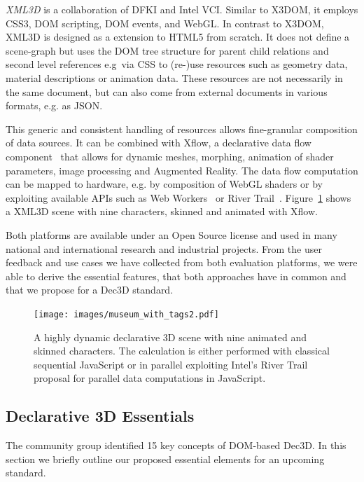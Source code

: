 \documentclass{acmsiggraph}
\begin{document}
\emph{XML3D} \cite{Sons2010} is a collaboration of DFKI and Intel VCI. Similar to X3DOM, it employs CSS3, DOM scripting, DOM events, and WebGL. In contrast to X3DOM, XML3D is designed as a extension to HTML5 from scratch. It does not define a scene-graph but uses the DOM tree structure for parent child relations and second level references e.g\ via CSS to (re-)use resources such as geometry data, material descriptions or animation data. These resources are not necessarily in the same document, but can also come from external documents in various formats, e.g. as JSON.

This generic and consistent handling of resources allows fine-granular composition of data sources. It can be combined with Xflow, a declarative data flow component~\cite{KleinSJRSB12} that allows for dynamic meshes, morphing, animation of shader parameters, image processing and Augmented Reality. The data flow computation can be mapped to hardware, e.g. by composition of WebGL shaders or by exploiting available APIs such as Web Workers~\cite{w3c:webworkers} or River Trail~\cite{Herhut:2012}. Figure~\ref{fig:xflow} shows a XML3D scene with nine characters, skinned and animated with Xflow.

Both platforms are available under an Open Source license and used in many national and international research and industrial projects. From the user feedback and use cases we have collected from both evaluation platforms, we were able to derive the essential features, that both approaches have in common and that we propose for a Dec3D standard.

\begin{figure}
  \centering
  \texttt{[image: images/museum\_with\_tags2.pdf]}
  \caption{A highly dynamic declarative 3D scene with nine animated and skinned characters. The calculation is either performed with classical sequential JavaScript or in parallel exploiting Intel's River Trail proposal for parallel data computations in JavaScript.}
  \label{fig:xflow}
\end{figure}


\subsection{Declarative 3D Essentials}
\label{subsection:essentials}

The community group identified 15 key concepts of DOM-based Dec3D. In this section we briefly outline our proposed essential elements for an upcoming standard. 
\end{document}
